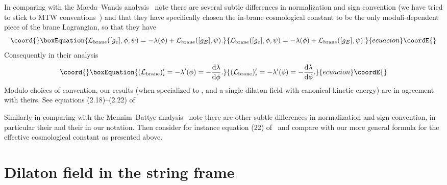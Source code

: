 \documentclass[a4paper,10pt]{article}
\begin{document}
{In comparing with the Maeda--Wands analysis~\cite{Wands} note there
are several subtle differences in normalization and sign convention
(we have tried to stick to MTW conventions~\cite{MTW}) and that they
have specifically chosen the in-brane cosmological constant to be the
only moduli-dependent piece of the brane Lagrangian, so that they have
%
\begin{equation}\coord{}\boxEquation{
\L_\brane([g_e],\phi,\psi) = - \lambda(\phi) + \L_\brane([g_E],\psi).
}{
\L_\brane([g_e],\phi,\psi) = - \lambda(\phi) + \L_\brane([g_E],\psi).
}{ecuacion}\coordE{}\end{equation}
%
Consequently in their analysis 
%
\begin{equation}\coord{}\boxEquation{
(\L_\brane)'_i  = - \lambda'(\phi) = - {\d\lambda\over\d\phi}.
}{
(\L_\brane)'_i  = - \lambda'(\phi) = - {\d\lambda\over\d\phi}.
}{ecuacion}\coordE{}\end{equation}
%
Modulo choices of convention, our results (when specialized to \coordHE{},
and a single dilaton field with canonical kinetic energy) are in
agreement with theirs. See equations (2.18)--(2.22) of~\cite{Wands}

Similarly in comparing with the Mennim--Battye analysis~\cite{Wands}
note there are other subtle differences in normalization and sign
convention, in particular their \coordHE{} and their \coordHE{} in our notation. Then consider for instance equation
(22) of~\cite{Mennim} and compare with our more general formula for the
effective cosmological constant as presented above.

\section{Dilaton field in the string frame}
\setcounter{equation}{0}


}
\end{document}
